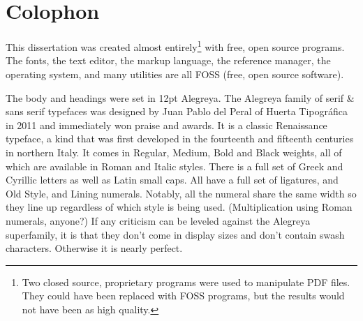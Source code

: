 \chapter{Colophon}
\small\OnehalfSpacing%

\begin{comment}
Two versions of this dissertation are available. The contents of both are identical; only the formatting differs.
\begin{enumerate}[nosep]
  \item \url{https://leonora.org}\\\noindent%
  This version, the readable version, has been formatted according to standard typographic practice with an emphasis on readability, and it is hoped, good taste and elegance. 
  \item \url{https://sjsu.edu}\\\noindent%
  This version, the official, submitted version, has been formatted to meet the SJSU Ed.D. doctoral dissertation guidelines You should read this version only under duress.
\end{enumerate}
\end{comment}

This dissertation was created almost entirely\footnote{Two closed source, proprietary programs were used to manipulate PDF files. They could have been replaced with FOSS programs, but the results would not have been as high quality.} with free, open source programs. The fonts, the text editor, the markup language, the reference manager, the operating system, and many utilities are all FOSS (free, open source software).

\begin{center}
  \textbf{\qquad\qquad{}\qquad\qquad{}\qquad\qquad{}\qquad\qquad{}}
\end{center}

The body and headings were set in 12pt Alegreya. The Alegreya family of serif \& sans serif typefaces was designed by Juan Pablo del Peral of Huerta Tipográfica in 2011 and immediately won praise and awards. It is a classic Renaissance typeface, a kind that was first developed in the fourteenth and fifteenth centuries in northern Italy. It comes in Regular, Medium, Bold and Black weights, all of which are available in Roman and Italic styles. There is a full set of Greek and Cyrillic letters as well as Latin small caps. All have a full set of ligatures, and Old Style, and Lining numerals. Notably, all the numeral share the same width so they line up regardless of which style is being used. (Multiplication using Roman numerals, anyone?) If any criticism can be leveled against the Alegreya superfamily, it is that they don't come in display sizes and don't contain swash characters. Otherwise it is nearly perfect.

